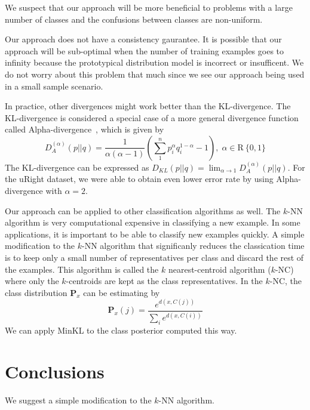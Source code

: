 \documentclass{article}
\begin{document}
We suspect that our approach will be more beneficial to problems with
a large number of classes and the confusions between classes are
non-uniform.

Our approach does not have a consistency gaurantee. It is
possible that our approach will be sub-optimal when the number of
training examples goes to infinity because the prototypical
distribution model is incorrect or insufficent. We do not worry
about this problem that much since we see our approach being used
in a small sample scenario.

In practice, other divergences might work better than the
KL-divergence. The KL-divergence is considered a special case of a
more general divergence function called
Alpha-divergence~\cite{Cichocki2010}, which is given by
\[
D^{(\alpha)}_A (p||q) = \frac{1}{\alpha(\alpha - 1)}\left( \sum_1^n
  p^{\alpha}_i q^{1-\alpha}_i - 1\right), \; \alpha \in \mathrm{R} \ \{0,1\}
\]
The KL-divergence can be expressed as $D_{KL} (p || q) = \lim_{\alpha
  \rightarrow 1} D^{(\alpha)}_A (p || q)$.  For the uRight dataset, we
were able to obtain even lower error rate by using Alpha-divergence
with $\alpha = 2$.

Our approach can be applied to other classification algorithms as
well. The $k$-NN algorithm is very computational expensive in
classifying a new example. In some applications, it is important to be
able to classify new examples quickly. A simple modification to the
$k$-NN algorithm that significanly reduces the classication time is to
keep only a small number of representatives per class and discard the
rest of the examples. This algorithm is called the $k$
nearest-centroid algorithm ($k$-NC) where only the $k$-centroids are
kept as the class representatives. In the $k$-NC, the class
distribution $\mathbf{P}_x$ can be estimating by
\[
\mathbf{P}_x(j) = \frac{e^{d(x,C(j))}}{\sum_i e^{d(x, C(i))} }
\]
We can apply MinKL to the class posterior computed this way. 


\section{Conclusions}
\label{sec:conclusion}

We suggest a simple modification to the $k$-NN algorithm.



\end{document}
